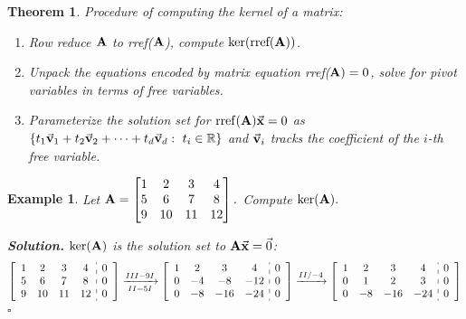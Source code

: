 \documentclass[12pt, a4paper]{article}
\newtheorem{thm}{Theorem}[subsection]
\newtheorem{eg}{Example}[subsection]
\newenvironment*{sol}{\par\indent\textbf{\textit{Solution. }}}{\hfill{$\square$}\par}
\def\R{{\mathbb{R}}}
\def\rref{\mathrm{rref}}
\def\vecx{\va{x}}
\def\vecv{\va{v}}
\def\matrixA{\vb{A}}
\begin{document}
\begin{thm}\label{thm3.3.4}
	Procedure of computing the kernel of a matrix:
	\begin{enumerate}
		\item Row reduce $\matrixA$ to rref($\matrixA$), compute $\ker(\text{rref}(\matrixA))$.
		\item Unpack the equations encoded by matrix equation rref($\matrixA)=0$, solve for pivot variables in terms of free variables.
		\item Parameterize the solution set for $\rref(\matrixA)\vecx=0$ as $\left\{t_1\vecv_1+t_2\vecv_2+\cdots+t_d\vecv_d:\ t_i\in\R\right\}$ and $\vecv_i$ tracks the coefficient of the $i$-th free variable.
	\end{enumerate}
\end{thm}
\begin{eg}
	Let $\matrixA=\begin{bmatrix}1&2&3&4\\5&6&7&8\\9&10&11&12\end{bmatrix}.$  Compute $\ker(\matrixA).$\\
	\begin{sol}
		$\ker(\matrixA)$ is the solution set to $\matrixA\vecx=\vec{0}$: 
		$$\begin{aligned}
			\left[\begin{array}{c:c}\begin{matrix}1&2&3&4\\5&6&7&8\\9&10&11&12\end{matrix}&\begin{matrix}0\\0\\0\end{matrix}\end{array}\right]\xrightarrow[II-5I]{III-9I}\left[\begin{array}{c:c}\begin{matrix}1&2&3&4\\0&-4&-8&-12\\0&-8&-16&-24\end{matrix}&\begin{matrix}0\\0\\0\end{matrix}\end{array}\right]&\xrightarrow[]{II/-4}\left[\begin{array}{c:c}\begin{matrix}1&2&3&4\\0&1&2&3\\0&-8&-16&-24\end{matrix}&\begin{matrix}0\\0\\0\end{matrix}\end{array}\right]\\

\end{aligned}$$
\end{sol}
\end{eg}
\end{document}
